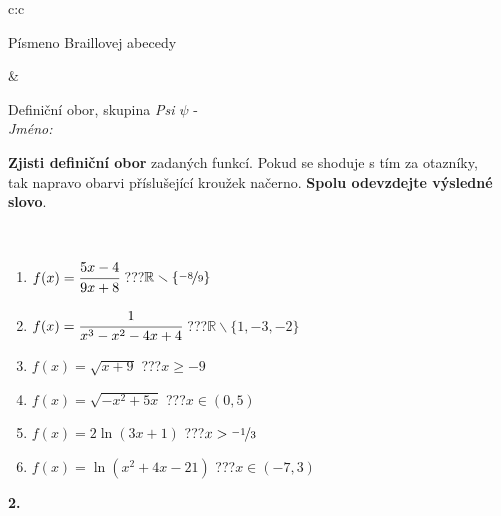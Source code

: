 \documentclass[10pt]{report}
\begin{document}
\begin{tabular}{c:c}
\begin{minipage}[c][104.5mm][t]{0.5\linewidth}
\begin{center}
\begin{minipage}{0.20\linewidth}
\begin{center}
{\small Písmeno Braillovej abecedy}
\end{center}
\end{minipage}
\end{center}
\end{minipage}
&
\begin{minipage}[c][104.5mm][t]{0.5\linewidth}
\begin{center}
\vspace{7mm}
{\huge Definiční obor, skupina \textit{Psi $\psi$} -}\\[5mm]
\textit{Jméno:}\phantom{xxxxxxxxxxxxxxxxxxxxxxxxxxxxxxxxxxxxxxxxxxxxxxxxxxxxxxxxxxxxxxxxx}\\[5mm]
\begin{minipage}{0.95\linewidth}
\begin{center}
\textbf{Zjisti definiční obor} zadaných funkcí. Pokud se shoduje s tím za otazníky,\\tak napravo obarvi příslušející kroužek načerno. \textbf{Spolu odevzdejte výsledné slovo}.
\end{center}
\end{minipage}
\\[1mm]
\begin{minipage}{0.79\linewidth}
\begin{center}
\begin{varwidth}{\linewidth}
\begin{enumerate}
\normalsizerrr
\item $f(x)=\cfrac{5x-4}{9x+8}$\quad \dotfill\; ???\;\dotfill \quad $\mathbb{R}\smallsetminus\{\nicefrac{-8}{9}\}$
\item $f(x)=\cfrac{1}{x^3-x^2-4x+4}$\quad \dotfill\; ???\;\dotfill \quad $\mathbb{R}\smallsetminus\{1,-3,-2\}$
\item $f(x)=\sqrt{x+9}$\quad \dotfill\; ???\;\dotfill \quad $x\geq-9$
\item $f(x)=\sqrt{-x^2+5x}$\quad \dotfill\; ???\;\dotfill \quad $x\in(0 , 5)$
\item $f(x)=2\ln{(3x+1)}$\quad \dotfill\; ???\;\dotfill \quad $x>\nicefrac{-1}{3}$
\item $f(x)=\ln{(x^2+4x-21)}$\quad \dotfill\; ???\;\dotfill \quad $x\in(-7 , 3)$
\end{enumerate}
\end{varwidth}
\end{center}
\end{minipage}
\begin{minipage}{0.20\linewidth}
\begin{center}
{\Huge\bfseries 2.} \\[2mm]

\end{center}
\end{minipage}
\end{center}
\end{minipage}
\end{tabular}
\end{document}
